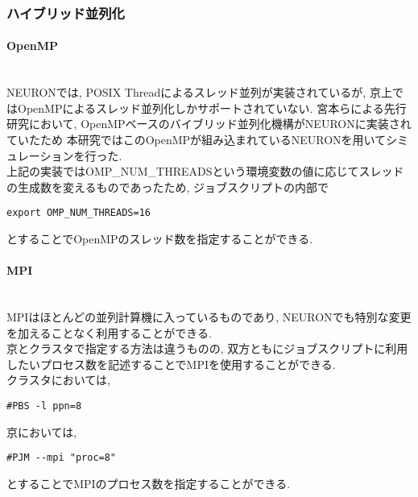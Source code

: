 \subsubsection{ハイブリッド並列化}
\label{subsubsec:hybrid}
\paragraph{OpenMP}~\\
NEURONでは, POSIX Threadによるスレッド並列が実装されているが, 京上ではOpenMPによるスレッド並列化しかサポートされていない.
宮本らによる先行研究\cite{miyamoto-master}において, OpenMPベースのバイブリッド並列化機構がNEURONに実装されていたため
本研究ではこのOpenMPが組み込まれているNEURONを用いてシミュレーションを行った.\\
上記の実装ではOMP\_NUM\_THREADSという環境変数の値に応じてスレッドの生成数を変えるものであったため, ジョブスクリプトの内部で
{\footnotesize
\begin{lstlisting}[caption=OpenMPスレッド数の指定,label=cluster-job-example,numbers=none]
export OMP_NUM_THREADS=16
\end{lstlisting}
}
とすることでOpenMPのスレッド数を指定することができる.\\

\paragraph{MPI}~\\
MPIはほとんどの並列計算機に入っているものであり, NEURONでも特別な変更を加えることなく利用することができる.\\
京とクラスタで指定する方法は違うものの, 双方ともにジョブスクリプトに利用したいプロセス数を記述することでMPIを使用することができる.\\
クラスタにおいては,
{\footnotesize
\begin{lstlisting}[caption=クラスタ MPIプロセス数の指定,label=cluster-mpi-num-process,numbers=none]
#PBS -l ppn=8
\end{lstlisting}
}
京においては,
{\footnotesize
\begin{lstlisting}[caption=京 MPIプロセス数の指定,label=k-mpi-num-process,numbers=none]
#PJM --mpi "proc=8"
\end{lstlisting}
}
とすることでMPIのプロセス数を指定することができる.\\

